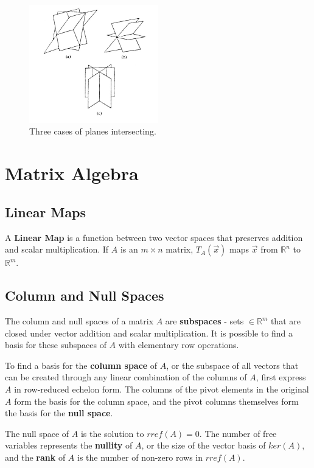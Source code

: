 \documentclass[11pt]{article}
\begin{document}
	\begin{figure}[htb]
		\centering
		\includegraphics[width=0.5\textwidth]{planarint.jpg}
		\caption{Three cases of planes intersecting.}
		\label{fig:planarint}
	\end{figure}
	
\section{Matrix Algebra}
	\subsection{Linear Maps}
		A \textbf{Linear Map} is a function between two vector spaces that preserves addition and scalar multiplication. If $A$ is an $m\times n$ matrix, $T_A(\vec{x})$ maps $\vec{x}$ from $\mathbb{R}^n$ to $\mathbb{R}^m$.
		
	\subsection{Column and Null Spaces}
		The column and null spaces of a matrix $A$ are \textbf{subspaces} - sets $\in \mathbb{R}^m$ that are closed under vector addition and scalar multiplication. It is possible to find a basis for these subspaces of $A$ with elementary row operations.
		
		To find a basis for the \textbf{column space} of $A$, or the subspace of all vectors that can be created through any linear combination of the columns of $A$, first express $A$ in row-reduced echelon form. The columns of the pivot elements in the original $A$ form the basis for the column space, and the pivot columns themselves form the basis for the \textbf{null space}.
		
		The null space of $A$ is the solution to $rref(A) = 0$. The number of free variables represents the \textbf{nullity} of $A$, or the size of the vector basis of $ker(A)$, and the \textbf{rank} of $A$ is the number of non-zero rows in $rref(A)$.
		
\end{document}
